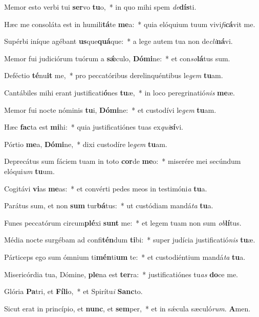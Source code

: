﻿\item Memor esto verbi tui \textbf{ser}vo \textbf{tu}o,~* in quo mihi spem \emph{de}\textbf{dís}ti.
\item Hæc me consoláta est in humili\textbf{tá}te \textbf{me}a:~* quia elóquium tuum vivi\emph{fi}\textbf{cá}vit me.
\item Supérbi iníque agébant \textbf{us}que\textbf{quá}que:~* a lege autem tua non de\emph{cli}\textbf{ná}vi.
\item Memor fui judiciórum tuórum a \textbf{sǽ}culo, \textbf{Dó}\textbf{mi}ne:~* et con\emph{so}\textbf{lá}tus sum.
\item Deféctio \textbf{té}nu\textbf{it} me,~* pro peccatóribus derelinquéntibus le\emph{gem} \textbf{tu}am.
\item Cantábiles mihi erant justificati\textbf{ó}nes \textbf{tu}æ,~* in loco peregrinatió\emph{nis} \textbf{me}æ.
\item Memor fui nocte nóminis \textbf{tu}i, \textbf{Dó}\textbf{mi}ne:~* et custodívi le\emph{gem} \textbf{tu}am.
\item Hæc \textbf{fac}ta est \textbf{mi}hi:~* quia justificatiónes tuas ex\emph{qui}\textbf{sí}vi.
\item Pórtio \textbf{me}a, \textbf{Dó}\textbf{mi}ne,~* dixi custodíre le\emph{gem} \textbf{tu}am.
\item Deprecátus sum fáciem tuam in toto \textbf{cor}de \textbf{me}o:~* miserére mei secúndum elóqui\emph{um} \textbf{tu}um.
\item Cogitávi \textbf{vi}as \textbf{me}as:~* et convérti pedes meos in testimóni\emph{a} \textbf{tu}a.
\item Parátus sum, et non \textbf{sum} tur\textbf{bá}tus:~* ut custódiam mandá\emph{ta} \textbf{tu}a.
\item Funes peccatórum circum\textbf{plé}xi \textbf{sunt} me:~* et legem tuam non sum \emph{ob}\textbf{lí}tus.
\item Média nocte surgébam ad confi\textbf{tén}dum \textbf{ti}bi:~* super judícia justificatió\emph{nis} \textbf{tu}æ.
\item Párticeps ego sum ómnium ti\textbf{mén}ti\textbf{um} te:~* et custodiéntium mandá\emph{ta} \textbf{tu}a.
\item Misericórdia tua, Dómine, \textbf{ple}na est \textbf{ter}ra:~* justificatiónes tu\emph{as} \textbf{do}ce me.
\item Glória \textbf{Pa}tri, et \textbf{Fí}\textbf{li}o,~* et Spirítu\emph{i} \textbf{Sanc}to.
\item Sicut erat in princípio, et \textbf{nunc}, et \textbf{sem}per,~* et in sǽcula sæculó\emph{rum}. \textbf{A}men.
